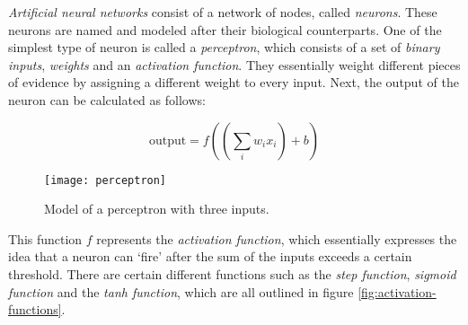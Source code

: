 \textit{Artificial neural networks} consist of a network of nodes, called \textit{neurons}.
These neurons are named and modeled after their biological counterparts.
One of the simplest type of neuron is called a \textit{perceptron}, which consists of a set of \textit{binary inputs}, \textit{weights} and an \textit{activation function}.
They essentially weight different pieces of evidence by assigning a different weight to every input.
Next, the output of the neuron can be calculated as follows:

$$\text{output} = f((\sum_{i} w_i x_i) + b)$$

\begin{figure}[ht]
  \centering
  \texttt{[image: perceptron]}
  \caption{Model of a perceptron with three inputs.}
  \label{fig:perceptron}
\end{figure}

\newpage

This function $f$ represents the \textit{activation function}, which essentially expresses the idea that a neuron can `fire' after the sum of the inputs exceeds a certain threshold.
There are certain different functions such as the \textit{step function}, \textit{sigmoid function} and the \textit{tanh function},
which are all outlined in figure \ref{fig:activation-functions}.

